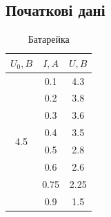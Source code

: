 \documentclass[a4paper,12pt]{article}
\begin{document}
	
	\newpage
	\recalctypearea
	\begin{center}
		\subsection*{\LARGE{Початкові дані}}
	\end{center}
	\begin{table}[htbp]
		\centering
		\caption{Батарейка}
		\begin{tabular}{|c|c|c|}
			\hline
			\textbf{$U_0, B$}    & \textbf{$I, A$} & \textbf{$U, B$} \\ \hline
			\multirow{8}{*}{4.5} & 0.1             & 4.3             \\ \cline{2-3} 
			& 0.2             & 3.8             \\ \cline{2-3} 
			& 0.3             & 3.6             \\ \cline{2-3} 
			& 0.4             & 3.5             \\ \cline{2-3} 
			& 0.5             & 2.8             \\ \cline{2-3} 
			& 0.6             & 2.6             \\ \cline{2-3} 
			& 0.75            & 2.25            \\ \cline{2-3} 
			& 0.9             & 1.5             \\ \hline
		\end{tabular}
	\end{table}
	
\end{document}
